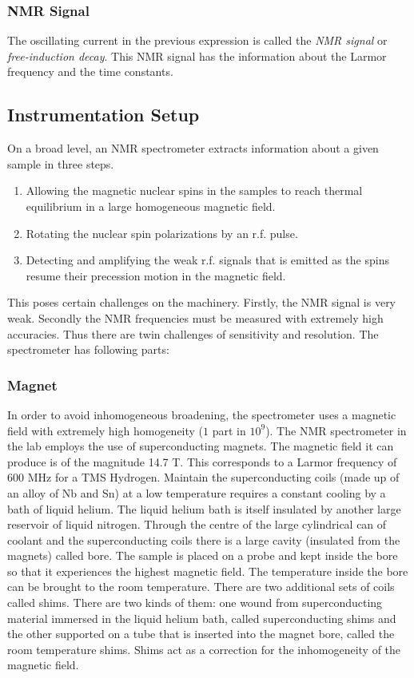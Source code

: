 		\subsubsection{NMR Signal}

		The oscillating current in the previous expression is called the \emph{NMR signal}
		or \emph{free-induction decay}. This NMR signal has the information about
		the Larmor frequency and the time constants.


	\subsection{Instrumentation Setup}
		On a broad level, an NMR spectrometer extracts information about a
		given sample in three steps. 
		\begin{enumerate}
		\item Allowing the magnetic nuclear spins in the samples to reach thermal
		equilibrium in a large homogeneous magnetic field.
		\item Rotating the nuclear spin polarizations by an r.f. pulse.
		\item Detecting and amplifying the weak r.f. signals that is emitted as
		the spins resume their precession motion in the magnetic field. 
		\end{enumerate}
		This poses certain challenges on the machinery. Firstly, the NMR signal
		is very weak. Secondly the NMR frequencies must be measured with extremely
		high accuracies. Thus there are twin challenges of sensitivity and
		resolution. The spectrometer has following parts:


		\subsubsection{Magnet}

		In order to avoid inhomogeneous broadening, the spectrometer uses a
		magnetic field with extremely high homogeneity ($1$ part in $10^{9}$).
		The NMR spectrometer in the lab employs the use of superconducting
		magnets. The magnetic field it can produce is of the magnitude 14.7
		T. This corresponds to a Larmor frequency of 600 MHz for a TMS Hydrogen.
		Maintain the superconducting coils (made up of an alloy of Nb and
		Sn) at a low temperature requires a constant cooling by a bath of
		liquid helium. The liquid helium bath is itself insulated by another
		large reservoir of liquid nitrogen. Through the centre of the large
		cylindrical can of coolant and the superconducting coils there is
		a large cavity (insulated from the magnets) called bore. The sample
		is placed on a probe and kept inside the bore so that it experiences
		the highest magnetic field. The temperature inside the bore can be
		brought to the room temperature. There are two additional sets of
		coils called shims. There are two kinds of them: one wound from superconducting
		material immersed in the liquid helium bath, called superconducting
		shims and the other supported on a tube that is inserted into the
		magnet bore, called the room temperature shims. Shims act as a correction
		for the inhomogeneity of the magnetic field.


